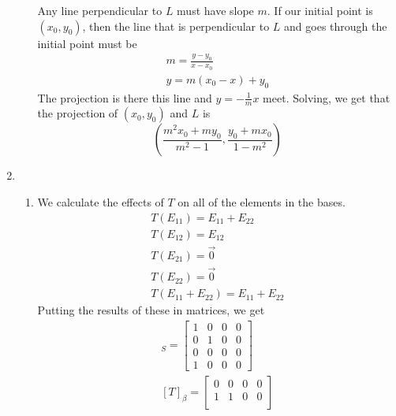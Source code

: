\documentclass[12pt]{article}
\begin{document}
\begin{enumerate}
\begin{enumerate}
                        Any line perpendicular to $L$ must have slope $m$.
                        If our initial point is $(x_0, y_0)$, then the line that is perpendicular to $L$ and goes through the initial point must be
                        \begin{gather*}
                              m=\frac{y-y_0}{x-x_0} \\
                              y=m(x_0-x)+y_0
                        \end{gather*}
                        The projection is there this line and $y=-\frac{1}{m}x$ meet.
                        Solving, we get that the projection of $(x_0, y_0)$ and $L$ is
                        \[\left(\frac{m^2x_0+my_0}{m^2-1}, \frac{y_0+mx_0}{1-m^2}\right)\]
            \end{enumerate}
      \item \begin{enumerate}
                  \item We calculate the effects of $T$ on all of the elements in the bases.
                        \begin{gather*}
                              T(E_{11})=E_{11}+E_{22} \\
                              T(E_{12})=E_{12} \\
                              T(E_{21})=\vec{0} \\
                              T(E_{22})=\vec{0} \\
                              T(E_{11}+E_{22})=E_{11}+E_{22}
                        \end{gather*}
                        Putting the results of these in matrices, we get
                        \begin{gather*}
                              [T]_S=\begin{bmatrix}
                                    1 & 0 & 0 & 0 \\
                                    0 & 1 & 0 & 0 \\
                                    0 & 0 & 0 & 0 \\
                                    1 & 0 & 0 & 0
                              \end{bmatrix} \\
                              [T]_\beta=\begin{bmatrix}
                                    0 & 0 & 0 & 0 \\
                                    1 & 1 & 0 & 0 \\

\end{bmatrix}
\end{gather*}
\end{enumerate}
\end{enumerate}
\end{document}
